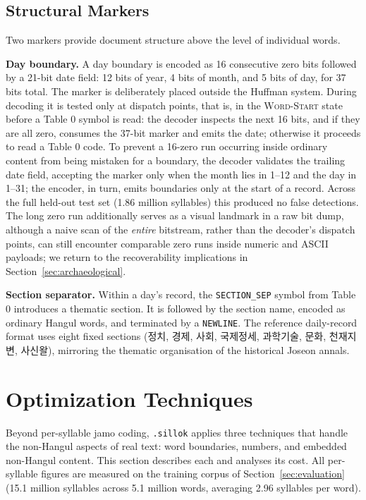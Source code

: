 \documentclass[conference]{IEEEtran}
\begin{document}
\subsection{Structural Markers}

Two markers provide document structure above the level of individual words.

\textbf{Day boundary.} A day boundary is encoded as 16 consecutive zero bits
followed by a 21-bit date field: 12 bits of year, 4 bits of month, and 5
bits of day, for 37 bits total. The marker is deliberately placed outside
the Huffman system. During decoding it is tested only at dispatch points,
that is, in the \textsc{Word-Start} state before a Table 0 symbol is read:
the decoder inspects the next 16 bits, and if they are all zero, consumes the
37-bit marker and emits the date; otherwise it proceeds to read a Table 0
code. To prevent a 16-zero run occurring inside ordinary content from being
mistaken for a boundary, the decoder validates the trailing date field,
accepting the marker only when the month lies in 1--12 and the day in 1--31;
the encoder, in turn, emits boundaries only at the start of a record. Across
the full held-out test set (1.86 million syllables) this produced no false
detections. The long zero run additionally serves as a visual landmark in a
raw bit dump, although a naive scan of the \emph{entire} bitstream, rather than
the decoder's dispatch points, can still encounter comparable zero runs inside
numeric and ASCII payloads; we return to the recoverability implications in
Section~\ref{sec:archaeological}.

\textbf{Section separator.} Within a day's record, the \texttt{SECTION\_SEP}
symbol from Table 0 introduces a thematic section. It is followed by the
section name, encoded as ordinary Hangul words, and terminated by a
\texttt{NEWLINE}. The reference daily-record format uses eight fixed
sections (정치, 경제, 사회, 국제정세, 과학기술, 문화, 천재지변, 사신왈),
mirroring the thematic organisation of the historical Joseon annals.

\section{Optimization Techniques}
\label{sec:optimizations}

Beyond per-syllable jamo coding, \texttt{.sillok} applies three techniques that
handle the non-Hangul aspects of real text: word boundaries, numbers, and
embedded non-Hangul content. This section describes each and analyses its cost.
All per-syllable figures are measured on the training corpus of
Section~\ref{sec:evaluation} (15.1 million syllables across 5.1 million words,
averaging 2.96 syllables per word).
\end{document}
